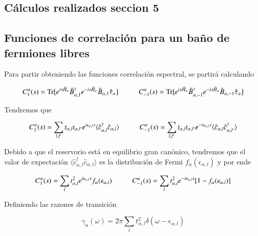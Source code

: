 \begin{appendixs}
\newpage

\section{Cálculos realizados seccion 5}
\subsection{Funciones de correlación para un baño de fermiones libres}
Para partir obteniendo las funciones correlación espectral, se partirá calculando

\begin{equation*}
    C_{1}^{\alpha}(s) = \text{Tr}[e^{is\hat{H}_{\alpha}}\hat{B}^{\dagger}_{\alpha,1}e^{-is\hat{H}_{\alpha}}\hat{B}_{\alpha,1}\hat{\tau}_{\alpha}  ]  \hspace{10mm} C_{-1}^{\alpha}(s) = \text{Tr}[e^{is\hat{H}_{\alpha}}\hat{B}^{\dagger}_{\alpha,-1}e^{-is\hat{H}_{\alpha}}\hat{B}_{\alpha,-1}\hat{\tau}_{\alpha}  ] 
\end{equation*}

Tendremos que

\begin{equation*}
    C_{1}^{\alpha}(s) = \sum_{l,l'}t_{\alpha,l}t_{\alpha,l'}e^{i\epsilon_{\alpha,l}s} \langle \hat{c}^{\dagger}_{\alpha,l}\hat{c}_{\alpha,l} \rangle \hspace{10mm} C
    ^{\alpha}_{-1}(s) = \sum_{l,l'}t_{\alpha,l}t_{\alpha,l'}e^{-i\epsilon_{\alpha,l}s} \langle \hat{c}_{\alpha,l}\hat{c}^{\dagger}_{\alpha,l'} \rangle
\end{equation*}

Debido a que el reservorio está en equilibrio gran canónico, tendremos que el valor de expectación $\langle \hat{c}^{\dagger}_{\alpha,l}\hat{c}_{\alpha,l}\rangle$ es la distribución de Fermi $f_{\alpha}(\epsilon_{\alpha,l})$ y por ende  

\begin{equation*}
    C_{1}^{\alpha}(s) = \sum_{l}t^{2}_{\alpha,l}e^{i\epsilon_{\alpha,l}s} f_{\alpha}(\epsilon_{\alpha,l}) \hspace{10mm} C
    ^{\alpha}_{-1}(s) = \sum_{l}t^{2}_{\alpha,l}e^{-i\epsilon_{\alpha,l}s} [1-f_{\alpha}(\epsilon_{\alpha,l})]
\end{equation*}

Definiendo las razones de transición

\begin{equation*}
    \gamma_{\alpha}(\omega) = 2\pi \sum_{l}t^{2}_{\alpha,l}\delta(\omega-\epsilon_{\alpha,l})
\end{equation*}


\end{appendixs}
